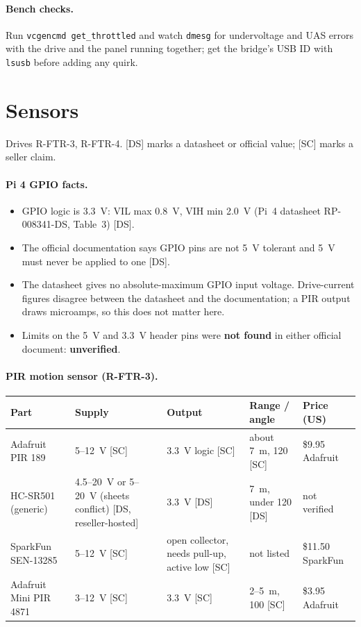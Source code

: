 \documentclass[11pt,a4paper]{article}
\begin{document}
\paragraph{Bench checks.} Run \texttt{vcgencmd get\_throttled} and watch \texttt{dmesg} for undervoltage and UAS errors with the drive and the panel running together; get the bridge's USB ID with \texttt{lsusb} before adding any quirk.

\section{Sensors}
Drives R-FTR-3, R-FTR-4. [DS] marks a datasheet or official value; [SC] marks a seller claim.

\paragraph{Pi 4 GPIO facts.}
\begin{itemize}
  \item GPIO logic is 3.3~V: VIL max 0.8~V, VIH min 2.0~V (Pi~4 datasheet RP-008341-DS, Table~3) [DS].
  \item The official documentation says GPIO pins are not 5~V tolerant and 5~V must never be applied to one [DS].
  \item The datasheet gives no absolute-maximum GPIO input voltage. Drive-current figures disagree between the datasheet and the documentation; a PIR output draws microamps, so this does not matter here.
  \item Limits on the 5~V and 3.3~V header pins were \textbf{not found} in either official document: \textbf{unverified}.
\end{itemize}

\paragraph{PIR motion sensor (R-FTR-3).}
\begin{longtable}{p{3.1cm} p{2.9cm} p{3.4cm} p{2.9cm} p{2.4cm}}
\toprule
\textbf{Part} & \textbf{Supply} & \textbf{Output} & \textbf{Range / angle} & \textbf{Price (US)} \\
\midrule\endhead
Adafruit PIR 189 & 5--12~V [SC] & 3.3~V logic [SC] & about 7~m, 120\textdegree{} [SC] & \$9.95 Adafruit \\
HC-SR501 (generic) & 4.5--20~V or 5--20~V (sheets conflict) [DS, reseller-hosted] & 3.3~V [DS] & 7~m, under 120\textdegree{} [DS] & not verified \\
SparkFun SEN-13285 & 5--12~V [SC] & open collector, needs pull-up, active low [SC] & not listed & \$11.50 SparkFun \\
Adafruit Mini PIR 4871 & 3--12~V [SC] & 3.3~V [SC] & 2--5~m, 100\textdegree{} [SC] & \$3.95 Adafruit \\
\bottomrule
\end{longtable}
\end{document}
